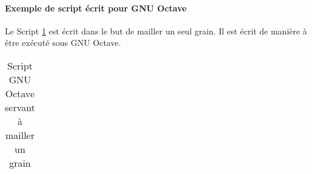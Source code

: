 \paragraph{Exemple de script écrit pour GNU Octave\\}
Le Script \ref{annexe:script_maillage} est écrit dans le but de mailler un seul grain. Il est écrit de manière à être exécuté sous GNU Octave.
\captionsetup[table]{name=Script, position=bottom}
\begin{table}\centering
	\begin{tabular}{p{}}
		\hline
		\\
		\hline
	\end{tabular}
	\caption{\label{annexe:script_maillage}Script GNU Octave servant à mailler un grain}
\end{table}
\captionsetup[table]{name=Tableau, position=bottom}